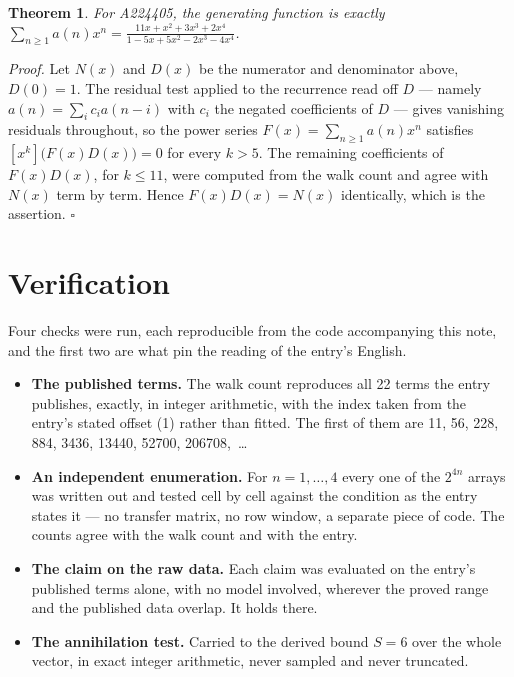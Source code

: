 \documentclass[11pt]{article}
\newtheorem{theorem}{Theorem}
\theoremstyle{definition}
\begin{document}
\begin{theorem} For A224405, the generating function is exactly $\sum_{n\ge 1} a(n)x^n = \frac{11x + x^{2} + 3x^{3} + 2x^{4}}{1 - 5x + 5x^{2} - 2x^{3} - 4x^{4}}$.\end{theorem}

{\itshape Proof.} Let $N(x)$ and $D(x)$ be the numerator and denominator above, $D(0)=1$. The residual test applied to the recurrence read off $D$ --- namely $a(n) = \sum_i c_i a(n-i)$ with $c_i$ the negated coefficients of $D$ --- gives vanishing residuals throughout, so the power series $F(x)=\sum_{n\ge 1}a(n)x^n$ satisfies $[x^k]\bigl(F(x)D(x)\bigr) = 0$ for every $k > 5$. The remaining coefficients of $F(x)D(x)$, for $k \le 11$, were computed from the walk count and agree with $N(x)$ term by term. Hence $F(x)D(x) = N(x)$ identically, which is the assertion. $\square$

\section{Verification}

Four checks were run, each reproducible from the code accompanying this note, and the first two are what pin the reading of the entry's English.

\begin{itemize}

\item {\bfseries The published terms.} The walk count reproduces all 22 terms the entry publishes, exactly, in integer arithmetic, with the index taken from the entry's stated offset (1) rather than fitted. The first of them are 11, 56, 228, 884, 3436, 13440, 52700, 206708,~\dots

\item {\bfseries An independent enumeration.} For $n = 1,\dots,4$ every one of the $2^{4n}$ arrays was written out and tested cell by cell against the condition as the entry states it --- no transfer matrix, no row window, a separate piece of code. The counts agree with the walk count and with the entry.

\item {\bfseries The claim on the raw data.} Each claim was evaluated on the entry's published terms alone, with no model involved, wherever the proved range and the published data overlap. It holds there.

\item {\bfseries The annihilation test.} Carried to the derived bound $S = 6$ over the whole vector, in exact integer arithmetic, never sampled and never truncated.

\end{itemize}
\end{document}
